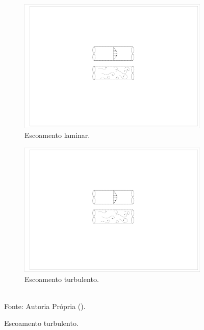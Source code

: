 \documentclass[_ArquivoPrincipal.tex]{subfiles}
\begin{document}
\begin{figure}[h]
    \centering
    \caption{Esquema de escoamentos.\label{fig:Escoamentos}}
    \begin{subfigure}{.45\textwidth}
        \centering
        \includegraphics[width=.75\linewidth]{Figuras/EscLaminar.pdf}
        \caption{Escoamento laminar.}
        \label{fig:EscLaminar}
      \end{subfigure}
      \begin{subfigure}{.45\textwidth}
        \centering
        \includegraphics[width=.75\linewidth]{Figuras/EscTurbulento.pdf}
        \caption{Escoamento turbulento.}
        \label{fig:EscTurbulento}
      \end{subfigure}
    \\Fonte: Autoria Própria (\the\year).
\end{figure}
\end{document}
